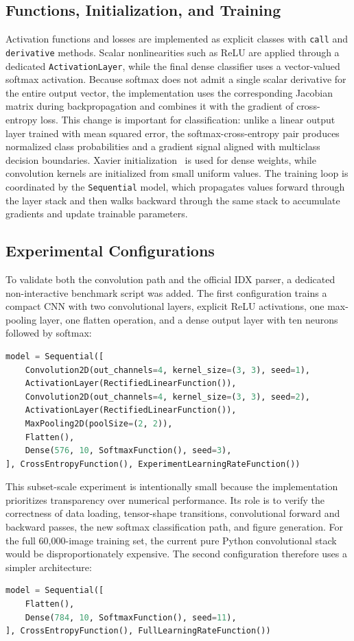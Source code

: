 \documentclass[]{ceurart}
\begin{document}
\subsection{Functions, Initialization, and Training}
Activation functions and losses are implemented as explicit classes with \texttt{call} and \texttt{derivative} methods. Scalar nonlinearities such as ReLU are applied through a dedicated \texttt{ActivationLayer}, while the final dense classifier uses a vector-valued softmax activation. Because softmax does not admit a single scalar derivative for the entire output vector, the implementation uses the corresponding Jacobian matrix during backpropagation and combines it with the gradient of cross-entropy loss. This change is important for classification: unlike a linear output layer trained with mean squared error, the softmax-cross-entropy pair produces normalized class probabilities and a gradient signal aligned with multiclass decision boundaries. Xavier initialization~\cite{glorot2010} is used for dense weights, while convolution kernels are initialized from small uniform values. The training loop is coordinated by the \texttt{Sequential} model, which propagates values forward through the layer stack and then walks backward through the same stack to accumulate gradients and update trainable parameters.

\subsection{Experimental Configurations}
To validate both the convolution path and the official IDX parser, a dedicated non-interactive benchmark script was added. The first configuration trains a compact CNN with two convolutional layers, explicit ReLU activations, one max-pooling layer, one flatten operation, and a dense output layer with ten neurons followed by softmax:
\begin{lstlisting}[language=Python]
model = Sequential([
    Convolution2D(out_channels=4, kernel_size=(3, 3), seed=1),
    ActivationLayer(RectifiedLinearFunction()),
    Convolution2D(out_channels=4, kernel_size=(3, 3), seed=2),
    ActivationLayer(RectifiedLinearFunction()),
    MaxPooling2D(poolSize=(2, 2)),
    Flatten(),
    Dense(576, 10, SoftmaxFunction(), seed=3),
], CrossEntropyFunction(), ExperimentLearningRateFunction())
\end{lstlisting}

This subset-scale experiment is intentionally small because the implementation prioritizes transparency over numerical performance. Its role is to verify the correctness of data loading, tensor-shape transitions, convolutional forward and backward passes, the new softmax classification path, and figure generation. For the full 60,000-image training set, the current pure Python convolutional stack would be disproportionately expensive. The second configuration therefore uses a simpler architecture:
\begin{lstlisting}[language=Python]
model = Sequential([
    Flatten(),
    Dense(784, 10, SoftmaxFunction(), seed=11),
], CrossEntropyFunction(), FullLearningRateFunction())
\end{lstlisting}
\end{document}

